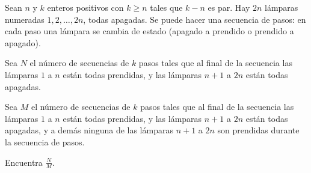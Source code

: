 Sean $n$ y $k$ enteros positivos con $k\geq n$ tales que $k-n$ es par. Hay $2n$ lámparas numeradas $1,2,\dots,2n$, todas apagadas. Se puede hacer una secuencia de pasos: en cada paso una lámpara se cambia de estado (apagado a prendido o prendido a apagado). \newline 

Sea $N$ el número de secuencias de $k$ pasos tales que al final de la secuencia las lámparas $1$ a $n$ están todas prendidas, y las lámparas $n+1$ a $2n$ están todas apagadas. \newline 

Sea $M$ el número de secuencias de $k$ pasos tales que al final de la secuencia las lámparas $1$ a $n$ están todas prendidas, y las lámparas $n+1$ a $2n$ están todas apagadas, y a demás ninguna de las lámparas $n+1$ a $2n$ son prendidas durante la secuencia de pasos.  \newline 

Encuentra $\frac{N}{M}$.